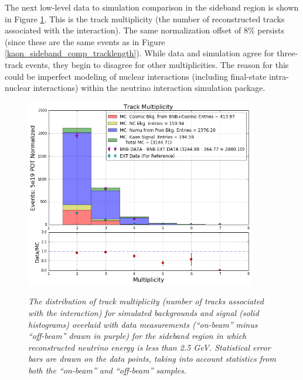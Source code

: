 The next low-level data to simulation comparison in the sideband region is shown in Figure \ref{kaon_sideband_comp_multiplicity}. This is the track multiplicity (the number of reconstructed tracks associated with the interaction). The same normalization offset of 8\% persists (since these are the same events as in Figure \ref{kaon_sideband_comp_tracklength}). While data and simulation agree for three-track events, they begin to disagree for other multiplicities. The reason for this could be imperfect modeling of nuclear interactions (including final-state intra-nuclear interactions) within the neutrino interaction simulation package.\\

\begin{figure}[ht!]
\centering
	\includegraphics[width=0.9\textwidth]{Figures/kaon_sideband_comp_multiplicity.png} \\
\caption{\textit{The distribution of track multiplicity (number of tracks associated with the interaction) for simulated backgrounds and signal (solid histograms) overlaid with data measurements (``on-beam'' minus ``off-beam'' drawn in purple) for the sideband region in which reconstructed neutrino energy is less than 2.5 GeV. Statistical error bars are drawn on the data points, taking into account statistics from both the ``on-beam'' and ``off-beam'' samples.}}\label{kaon_sideband_comp_multiplicity}
\end{figure}

